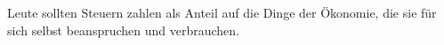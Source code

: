 Leute sollten Steuern zahlen als Anteil auf die Dinge der Ökonomie, die sie für sich selbst beanspruchen und verbrauchen.